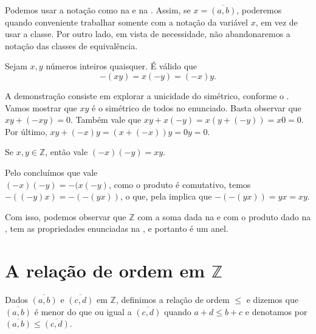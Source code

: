 \documentclass[../main.tex]{subfiles}
\begin{document}
Podemos usar a notação como na  e na . Assim, se $x = \overline{(a,b)}$, poderemos quando conveniente trabalhar somente com a notação da variável $x$, em vez de usar a classe. Por outro lado, em vista de necessidade, não abandonaremos a notação das classes de equivalência.

\begin{teo}\label{int-teo-produtoRegraSinal1}
    Sejam $x, y$ números inteiros quaisquer. É válido que 
    \[ -(xy) = x(-y) = (-x)y. \]
\end{teo}
\begin{dem}
    A demonstração consiste em explorar a unicidade do simétrico, conforme o .
    Vamos mostrar que $xy$ é o simétrico de todos no enunciado. Basta observar que $xy + (-xy) = 0$.
    Também vale que $xy + x(-y) = x(y+(-y)) = x0 = 0$. Por último, $xy + (-x)y = (x + (-x))y = 0y = 0$.
\end{dem}
\begin{corol}\label{int-corol-produtoRegraSinal2}
    Se $x,y \in \mathbb{Z}$, então vale $(-x)(-y) = xy$.
\end{corol}
\begin{dem}
    Pelo  concluímos que vale \\ $(-x)(-y) = -(x(-y)$, como o produto é comutativo, temos $-((-y)x) = -(-(yx))$,
    o que, pela  implica que $-(-(yx)) = yx = xy$.
\end{dem}

Com isso, podemos observar que $\mathbb{Z}$ com a soma dada na  e com o produto dado na , tem as propriedades enunciadas na , e portanto é um anel.

\section{A relação de ordem em $\mathbb{Z}$}
\begin{defi}\label{int-def-relacaoOrdem}
    Dados $\overline{(a,b)}$ e $\overline{(c,d)}$ em $\mathbb{Z}$, definimos a relação de ordem $\leq$ e dizemos que $\overline{(a,b)}$ é menor do que ou igual a $\overline{(c,d)}$ quando $a+d \leq b+c$ e denotamos por $\overline{(a,b)} \leq \overline{(c,d)}$.
\end{defi}
\end{document}
